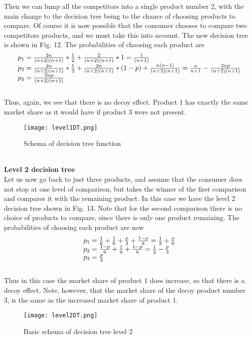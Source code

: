 Then we can lump all the competitors into a single product number 2, with the main change to the decision tree
being to the chance of choosing products to compare. Of course it is now possible that the consumer
chooses to compare two competitors products, and we must take this into account. The new decision tree is shown in Fig. 12.
The probabilities of choosing each product are
\\
\begin{equation} \label{eq:13}
\begin{array}{l@{}l}
p_1 = \frac{2n}{(n+2)(n+1)}*\frac{1}{2}+\frac{2}{(n+2)(n+1)}*1 = \frac{1}{(n+1)} \\
p_2 = \frac{2n}{(n+2)(n+1)}*\frac{1}{2}+\frac{2n}{(n+2)(n+1)}*(1-p) + \frac{n(n-1)}{(n+2)(n+1)} = \frac{n}{n+1} - \frac{2np}{(n+2)(n+1)} \\
p_3 = \frac{2np}{(n+2)(n+1)}
\end{array}
\end{equation}
\\
Thus, again, we see that there is no decoy effect. Product 1 has exactly the same market share as it would have if product 3 were not present.\\
\newpage
\begin{figure}[h!]
	\begin{center}
		\texttt{[image: level1DT.png]}
	\end{center}
	\caption{Schema of decision tree function}
	\label{Decision tree level 1}
\end{figure}
\\
\textbf{Level 2 decision tree}\\
Let us now go back to just three products, and assume that the consumer does not stop at one level of comparison,
but takes the winner of the first comparison and compares it with the remaining product. In this case
we have the level 2 decision tree shown in Fig. 13. Note that for the second comparison there is no
choice of products to compare, since there is only one product remaining. The probabilities of choosing each product are now\\
\begin{equation} \label{eq:14}
\begin{array}{l@{}l}
p_1 = \frac{1}{6}+\frac{1}{6}+\frac{p}{3}+\frac{1-p}{6}=\frac{1}{2}+\frac{p}{6} \\
p_2 = \frac{1-p}{6}+\frac{1}{6}+\frac{1-p}{6}=\frac{1}{2}-\frac{p}{3} \\
p_3 = \frac{p}{3}
\end{array}
\end{equation}
\\
Thus in this case the market share of product 1 does increase, so that there is a decoy effect.
Note, however, that the market share of the decoy product number 3, is the same as the increased market share of product 1.
\\
\begin{figure}[h!]
	\begin{center}
		\texttt{[image: level2DT.png]}
	\end{center}
	\caption{Basic schema of decision tree level 2}
	\label{Decision tree level 2}
\end{figure}
\newpage
